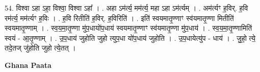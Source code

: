 \documentclass[17pt]{extarticle}
\begin{document}
54. विश्वा ऽहा ऽहा॒ विश्वा॒ विश्वा ऽहा᳚ । . अहा ऽम॑र्त्य॒ मम॑र्त्य॒ महा ऽहा ऽम॑र्त्यम् । . अम॑र्त्यꣳ ह॒विर्. ह॒वि रम॑र्त्य॒ मम॑र्त्यꣳ ह॒विः । . ह॒वि रितीति॑ ह॒विर्. ह॒विरिति॑ । . इति॑ स्वयमातृ॒ण्णाꣳ स्व॑यमातृ॒ण्णा मितीति॑ स्वयमातृ॒ण्णाम् । . स्व॒य॒मा॒तृ॒ण्णा मु॑प॒धायो॑प॒धाय॑ स्वयमातृ॒ण्णाꣳ स्व॑यमातृ॒ण्णा मु॑प॒धाय॑ । . स्व॒य॒मा॒तृ॒ण्णामिति॑ स्वयं - आ॒तृ॒ण्णाम् । . उ॒प॒धाय॑ जुहोति जुहो त्युप॒धा यो॑प॒धाय॑ जुहोति । . उ॒प॒धायेत्यु॑प - धाय॑ । . जु॒हो॒ त्ये॒ तदे॒तज् जु॑होति जुहो त्ये॒तत् । \newline

\textbf{Ghana Paata } \newline
\end{document}
